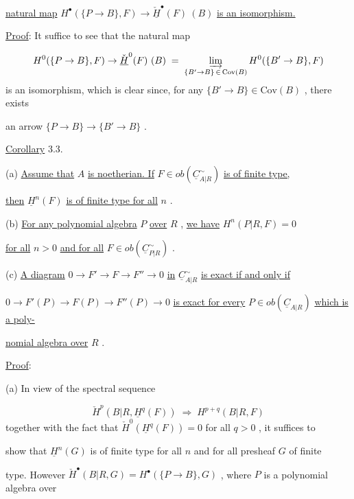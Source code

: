 \underline{natural map}  $H^{\bullet}(\{P \to B\},F) \to \check{\underline{H}}^{\bullet}(F)\ (B)$  \underline{is an isomorphism.}

\underline{Proof}:  It suffice to see that the natural map

\begin{equation*}
H^{0}(\{P \to B\},F) \to \check{\underline{H}}^{0}(F)\ (B) \;=\; \varinjlim_{\{B' \to B\}\, \in\, \mathrm{Cov}(B)} H^{0}(\{B' \to B\},F)
\end{equation*}
is an isomorphism, which is clear since, for any  $\{B' \to B\} \in \mathrm{Cov}(B)$  , there exists

an arrow  $\{P \to B\} \to \{B' \to B\}$  .


\underline{Corollary} 3.3.

(a)  \underline{Assume that}  $A$  \underline{is noetherian. If}  $F \in ob(\underline{C}^{\sim}_{A|R})$  \underline{is of finite type,}

\underline{then}  $\underline{H}^{n}(F)$  \underline{is of finite type for all}  $n$  .

(b)  \underline{For any polynomial algebra}  $P$  \underline{over}  $R$  , \underline{we have}  $H^{n}(P|R,F) = 0$

\underline{for all}  $n > 0$  \underline{and for all}  $F \in ob(\underline{C}^{\sim}_{P|R})$  .

(c)  \underline{A diagram}  $0 \to F' \to F \to F'' \to 0$  \underline{in}  $\underline{C}^{\sim}_{A|R}$  \underline{is exact if and only if}

$0 \to F'(P) \to F(P) \to F''(P) \to 0$  \underline{is exact for every}  $P \in ob(\underline{C}_{A|R})$  \underline{which is a poly-}

\underline{nomial algebra over}  $R$  .

\underline{Proof}:

(a)  In view of the spectral sequence

\begin{equation*}
\check{H}^{p}(B|R,\underline{H}^{q}(F)) \;\Rightarrow\; H^{p+q}(B|R,F)
\end{equation*}
together with the fact that  $\check{H}^{0}(\underline{H}^{q}(F)) = 0$  for all  $q > 0$  , it suffices to

show that  $\underline{H}^{n}(G)$  is of finite type for all  $n$  and for all presheaf  $G$  of finite

type. However  $\check{H}^{\bullet}(B|R,G) = H^{\bullet}(\{P \to B\},G)$  , where  $P$  is a polynomial algebra over

